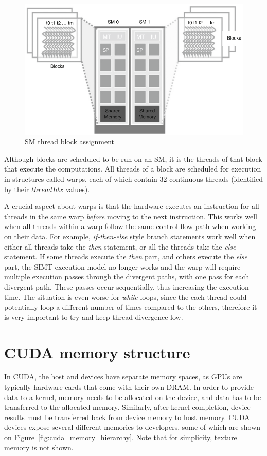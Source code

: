 \documentclass[10pt, a4paper]{report}
\begin{document}
\begin{figure}[h]
\centering
\includegraphics[scale=0.4]{figs/sm_thread_block_assignment}
\caption{SM thread block assignment}
\label{fig:sm_thread_block_assignment}
\end{figure}

Although blocks are scheduled to be run on an SM, it is the threads of that
block that execute the computations.
All threads of a block are scheduled for execution in structures called warps,
each of which contain 32 continuous threads (identified by their $threadIdx$
values).

A crucial aspect about warps is that the hardware executes an instruction for
all threads in the same warp \emph{before} moving to the next instruction.
This works well when all threads within a warp follow the same control flow path
when working on their data.
For example, \emph{if-then-else} style branch statements work well when either
all threads take the \emph{then} statement, or all the threads take the
\emph{else} statement.
If some threads execute the \emph{then} part, and others execute the \emph{else}
part, the SIMT execution model no longer works and the warp will require
multiple execution passes through the divergent paths, with one pass for each
divergent path.
These passes occur sequentially, thus increasing the execution time.
The situation is even worse for \emph{while} loops, since the each thread could
potentially loop a different number of times compared to the others, therefore
it is very important to try and keep thread divergence low.

\section{CUDA memory structure}
In CUDA, the host and devices have separate memory spaces, as GPUs are typically
hardware cards that come with their own DRAM.
In order to provide data to a kernel, memory needs to be allocated on the
device, and data has to be transferred to the allocated memory.
Similarly, after kernel completion, device results must be transferred back from
device memory to host memory.
CUDA devices expose several different memories to developers, some of which are
shown on Figure~\ref{fig:cuda_memory_hierarchy}.
Note that for simplicity, texture memory is not shown.
\end{document}
